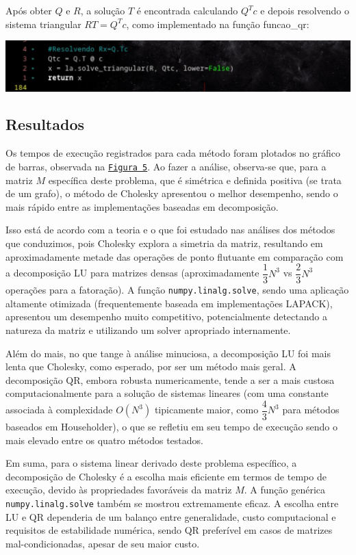 \documentclass{article}
\begin{document}
    Após obter $Q$ e $R$, a solução $T$ é encontrada calculando $Q^T c$ e depois resolvendo o sistema triangular $RT = Q^T c$, como implementado na função funcao\_qr:

    \begin{center}
    \includegraphics[width=0.8\linewidth]{imgs/qr_2.png}
    \end{center}

    \hypertarget{1}{}

    \subsection{Resultados}

    Os tempos de execução registrados para cada método foram plotados no gráfico de barras, observada na \hyperlink{2}{\texttt{Figura 5}}. Ao fazer a análise, observa-se que, para a matriz $M$ específica deste problema, que é simétrica e definida positiva (se trata de um grafo), o método de Cholesky apresentou o melhor desempenho, sendo o mais rápido entre as implementações baseadas em decomposição.

    Isso está de acordo com a teoria e o que foi estudado nas análises dos métodos que conduzimos, pois Cholesky explora a simetria da matriz, resultando em aproximadamente metade das operações de ponto flutuante em comparação com a decomposição LU para matrizes densas (aproximadamente $\dfrac{1}{3}N^3$ vs $\dfrac{2}{3}N^3$ operações para a fatoração). A função \texttt{numpy.linalg.solve}, sendo uma aplicação altamente otimizada (frequentemente baseada em implementações LAPACK), apresentou um desempenho muito competitivo, potencialmente detectando a natureza da matriz e utilizando um solver apropriado internamente.

    Além do mais, no que tange à análise minuciosa, a decomposição LU foi mais lenta que Cholesky, como esperado, por ser um método mais geral. A decomposição QR, embora robusta numericamente, tende a ser a mais custosa computacionalmente para a solução de sistemas lineares (com uma constante associada à complexidade $O(N^3)$ tipicamente maior, como $\dfrac{4}{3}N^3$ para métodos baseados em Householder), o que se refletiu em seu tempo de execução sendo o mais elevado entre os quatro métodos testados.

    Em suma, para o sistema linear derivado deste problema específico, a decomposição de Cholesky é a escolha mais eficiente em termos de tempo de execução, devido às propriedades favoráveis da matriz $M$. A função genérica \texttt{numpy.linalg.solve} também se mostrou extremamente eficaz. A escolha entre LU e QR dependeria de um balanço entre generalidade, custo computacional e requisitos de estabilidade numérica, sendo QR preferível em casos de matrizes mal-condicionadas, apesar de seu maior custo.
\end{document}
